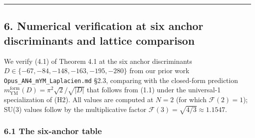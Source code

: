 \documentclass[
  11pt,
  a4paper,
]{amsart}
\begin{document}
\begin{center}\rule{0.5\linewidth}{0.5pt}\end{center}

\hypertarget{numerical-verification-at-six-anchor-discriminants-and-lattice-comparison}{%
\subsection{6. Numerical verification at six anchor discriminants and lattice comparison}\label{numerical-verification-at-six-anchor-discriminants-and-lattice-comparison}}

We verify (4.1) of Theorem 4.1 at the six anchor discriminants \(D \in \{-67, -84, -148, -163, -195, -280\}\) from our prior work \texttt{Opus\_AN4\_mYM\_Laplacien.md} §2.3, comparing with the closed-form prediction \(m_{\mathrm{YM}}^{\mathrm{form}}(D) = \pi^2 \sqrt{2} / \sqrt{|D|}\) that follows from (1.1) under the universal-1 specialization of (H2). All values are computed at \(N = 2\) (for which \(\mathcal{F}(2) = 1\)); SU(3) values follow by the multiplicative factor \(\mathcal{F}(3) = \sqrt{4/3} \approx 1.1547\).

\hypertarget{the-six-anchor-table}{%
\subsubsection{6.1 The six-anchor table}\label{the-six-anchor-table}}
\end{document}
